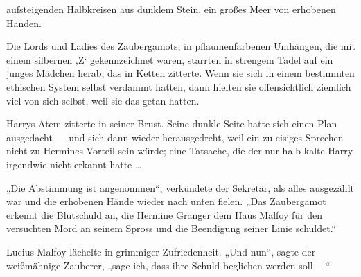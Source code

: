 

 aufsteigenden Halbkreisen aus dunklem Stein, ein großes Meer von erhobenen Händen.

\hplettrineextrapara
Die Lords und Ladies des Zaubergamots, in pflaumenfarbenen Umhängen, die mit einem silbernen ‚Z‘ gekennzeichnet waren, starrten in strengem Tadel auf ein junges Mädchen herab, das in Ketten zitterte. Wenn sie sich in einem bestimmten ethischen System selbst verdammt hatten, dann hielten sie offensichtlich ziemlich viel von sich selbst, weil sie das getan hatten.

Harrys Atem zitterte in seiner Brust. Seine dunkle Seite hatte sich einen Plan ausgedacht — und sich dann wieder herausgedreht, weil ein zu eisiges Sprechen nicht zu Hermines Vorteil sein würde; eine Tatsache, die der nur halb kalte Harry irgendwie nicht erkannt hatte …

„Die Abstimmung ist angenommen“, verkündete der Sekretär, als alles ausgezählt war und die erhobenen Hände wieder nach unten fielen.
„Das Zaubergamot erkennt die Blutschuld an, die Hermine Granger dem Haus Malfoy für den versuchten Mord an seinem Spross und die Beendigung seiner Linie schuldet.“

Lucius Malfoy lächelte in grimmiger Zufriedenheit.
„Und nun“, sagte der weißmähnige Zauberer, „sage ich, dass ihre Schuld beglichen werden soll —“

